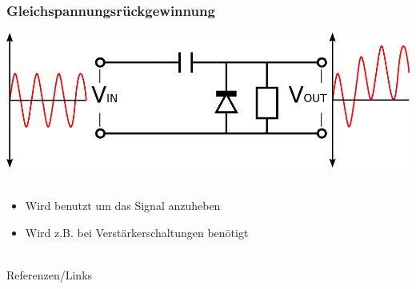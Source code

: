 \begin{frame}
  \frametitle{Gleichspannungsrückgewinnung}
  \begin{center}
    \includegraphics[width=1\textwidth,height=.6\textheight,keepaspectratio]{a05/Positive_Voltage_Clamping_Circuit.png}\\
    \tiny \hyperlink{refs}{\cite{wm}} \\[1em] \large
    \begin{itemize}
      \item Wird benutzt um das Signal anzuheben
      \item Wird z.B. bei Verstärkerschaltungen benötigt
    \end{itemize}
  \end{center}
\end{frame}

\renewcommand{\refname}{Referenzen}

\hypertarget{refs}{}
\textcolor{white}{} \\ %
\Large Referenzen/Links
\footnotesize

